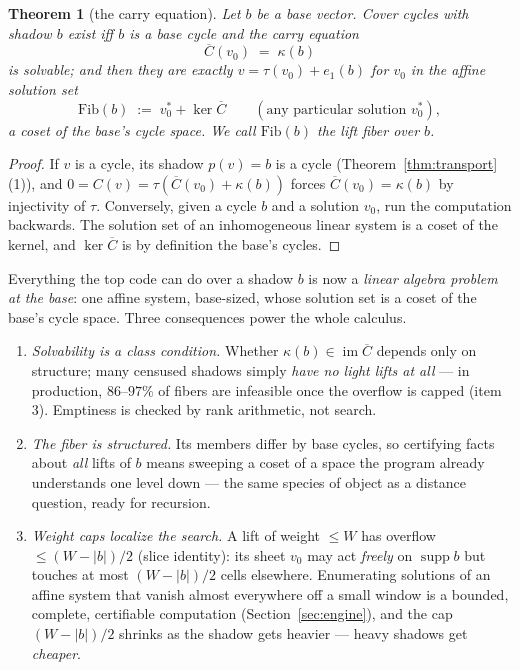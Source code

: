 \documentclass[11pt]{article}
\theoremstyle{plain}
\newtheorem{theorem}{Theorem}[section]
\theoremstyle{definition}
\theoremstyle{remark}
\newcommand{\suppop}{\operatorname{supp}}
\newcommand{\wt}[1]{\lvert #1\rvert}
\newcommand{\ov}[1]{\overline{#1}}
\begin{document}
\begin{theorem}[the carry equation]\label{thm:carry}
Let $b$ be a base vector. Cover cycles with shadow $b$ exist iff $b$ is a
base cycle and the \emph{carry equation}
\[
\ov C(v_0) \;=\; \kappa(b)
\]
is solvable; and then they are exactly $v = \tau(v_0) + e_1(b)$ for $v_0$
in the affine solution set
\[
\mathrm{Fib}(b) \;:=\; v_0^\ast + \ker \ov C
\qquad (\text{any particular solution } v_0^\ast),
\]
a coset of the base's \emph{cycle space}. We call $\mathrm{Fib}(b)$ the
\emph{lift fiber} over $b$.
\end{theorem}

\begin{proof}
If $v$ is a cycle, its shadow $p(v) = b$ is a cycle
(Theorem~\ref{thm:transport}(1)), and $0 = C(v) = \tau(\ov C(v_0) +
\kappa(b))$ forces $\ov C(v_0) = \kappa(b)$ by injectivity of $\tau$.
Conversely, given a cycle $b$ and a solution $v_0$, run the computation
backwards. The solution set of an inhomogeneous linear system is a coset
of the kernel, and $\ker \ov C$ is by definition the base's cycles.
\end{proof}

\begin{keyidea}
Everything the top code can do over a shadow $b$ is now a \emph{linear
algebra problem at the base}: one affine system, base-sized, whose
solution set is a coset of the base's cycle space. Three consequences
power the whole calculus.
\begin{enumerate}[leftmargin=2em]
\item \emph{Solvability is a class condition.} Whether
  $\kappa(b) \in \operatorname{im} \ov C$ depends only on structure; many
  censused shadows simply \emph{have no light lifts at all} --- in
  production, $86$--$97\%$ of fibers are infeasible once the overflow is
  capped (item 3). Emptiness is checked by rank arithmetic, not search.
\item \emph{The fiber is structured.} Its members differ by base cycles,
  so certifying facts about \emph{all} lifts of $b$ means sweeping a coset
  of a space the program already understands one level down --- the same
  species of object as a distance question, ready for recursion.
\item \emph{Weight caps localize the search.} A lift of weight $\leq W$
  has overflow $\leq (W - \wt b)/2$ (slice identity): its sheet $v_0$ may
  act \emph{freely} on $\suppop b$ but touches at most $(W - \wt b)/2$
  cells elsewhere. Enumerating solutions of an affine system that vanish
  almost everywhere off a small window is a bounded, complete,
  certifiable computation (Section~\ref{sec:engine}), and the cap
  $(W - \wt b)/2$ shrinks as the shadow gets heavier --- heavy shadows get
  \emph{cheaper}.
\end{enumerate}
\end{keyidea}
\end{document}

